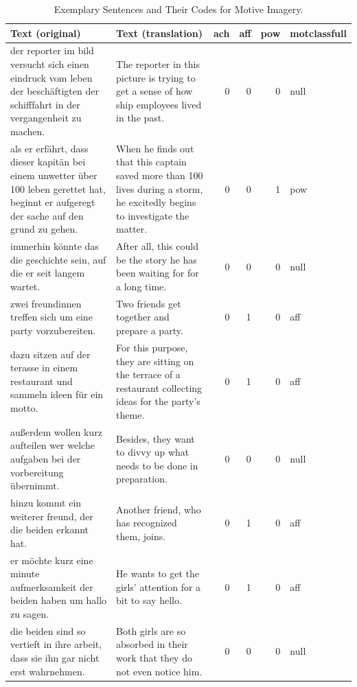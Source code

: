 \documentclass[man,a4paper,mask]{apa6}\usepackage[]{graphicx}\usepackage[]{color}
\begin{document}
\begin{table}
		\caption{Exemplary Sentences and Their Codes for Motive Imagery.}
		\label{tab:dathead}
		\footnotesize
		\begin{tabularx}{\textwidth}{XXrrrl}
		\toprule
		
Text (original) & Text (translation) & ach & aff & pow & motclassfull \\ 
  \hline
der reporter im bild versucht sich einen eindruck vom leben der beschäftigten der schifffahrt in der vergangenheit zu machen. & The reporter in this picture is trying to get a sense of how ship employees lived in the past. &   0 &   0 &   0 & null \\ 
  als er erfährt, dass dieser kapitän bei einem unwetter über 100 leben gerettet hat, beginnt er aufgeregt der sache auf den grund zu gehen. & When he finds out that this captain saved more than 100 lives during a storm, he excitedly begins to investigate the matter. &   0 &   0 &   1 & pow \\ 
  immerhin könnte das die geschichte sein, auf die er seit langem wartet. & After all, this could be the story he has been waiting for for a long time. &   0 &   0 &   0 & null \\ 
  zwei freundinnen treffen sich um eine party vorzubereiten. & Two friends get together and prepare a party. &   0 &   1 &   0 & aff \\ 
  dazu sitzen auf der terasse in einem restaurant und sammeln ideen für ein motto. & For this purpose, they are sitting on the terrace of a restaurant collecting ideas for the party’s theme. &   0 &   1 &   0 & aff \\ 
  außerdem wollen kurz aufteilen wer welche aufgaben bei der vorbereitung übernimmt. & Besides, they want to divvy up what needs to be done in preparation. &   0 &   0 &   0 & null \\ 
  hinzu kommt ein weiterer freund, der die beiden erkannt hat. & Another friend, who has recognized them, joins. &   0 &   1 &   0 & aff \\ 
  er möchte kurz eine minute aufmerksamkeit der beiden haben um hallo zu sagen. & He wants to get the girls’ attention for a bit to say hello. &   0 &   1 &   0 & aff \\ 
  die beiden sind so vertieft in ihre arbeit, dass sie ihn gar nicht erst wahrnehmen. & Both girls are so absorbed in their work that they do not even notice him. &   0 &   0 &   0 & null \\ 

\end{tabularx}
\end{table}
\end{document}
